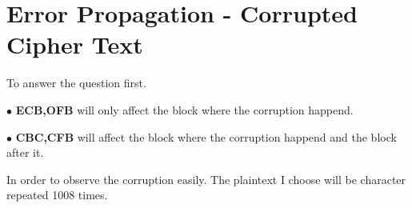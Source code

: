 \documentclass{article}
\begin{document}
    \section{Error Propagation - Corrupted Cipher Text}
    To answer the question first.
    \begin{tlist}{2}
      \item[$\bullet$]\textbf{ECB,OFB} will only affect the block where the corruption happend.
      \item[$\bullet$]\textbf{CBC,CFB} will affect the block where the corruption happend and the block after it.
    \end{tlist}
    In order to observe the corruption easily. The plaintext I choose will be character  repeated 1008 times.
  
\end{document}
